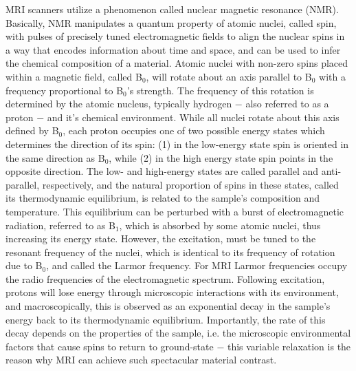 MRI scanners utilize a phenomenon called nuclear magnetic resonance (NMR). Basically, NMR manipulates a quantum property of atomic nuclei, called spin, with pulses of precisely tuned electromagnetic fields to align the nuclear spins in a way that encodes information about time and space, and can be used to infer the chemical composition of a material. Atomic nuclei with non-zero spins placed within a magnetic field, called B$_0$, will rotate about an axis parallel to B$_0$ with a frequency proportional to B$_0$'s strength. The frequency of this rotation is determined by the atomic nucleus, typically hydrogen $-$ also referred to as a proton $-$ and it's chemical environment. While all nuclei rotate about this axis defined by B$_0$, each proton occupies one of two possible energy states which determines the direction of its spin: (1) in the low-energy state spin is oriented in the same direction as B$_0$, while (2) in the high energy state spin points in the opposite direction. The low- and high-energy states are called parallel and anti-parallel, respectively, and the natural proportion of spins in these states, called its thermodynamic equilibrium, is related to the sample's composition and temperature. This equilibrium can be perturbed with a burst of electromagnetic radiation, referred to as B$_1$, which is absorbed by some atomic nuclei, thus increasing its energy state. However, the excitation, must be tuned to the resonant frequency of the nuclei, which is identical to its frequency of rotation due to B$_0$, and called the Larmor frequency. For MRI Larmor frequencies occupy the radio frequencies of the electromagnetic spectrum. Following excitation, protons will lose energy through microscopic interactions with its environment, and macroscopically, this is observed as an exponential decay in the sample's energy back to its thermodynamic equilibrium. Importantly, the rate of this decay depends on the properties of the sample, i.e. the microscopic environmental factors that cause spins to return to ground-state $-$ this variable relaxation is the reason why MRI can achieve such spectacular material contrast.

